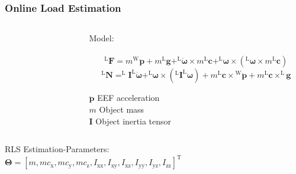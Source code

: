 \documentclass[student,noshadow]{ITRslides}
\renewcommand{\vec}[1]{\boldsymbol{#1}}
\renewcommand{\vec}[1]{\boldsymbol{#1}}
\newcommand{\scr}[1]{\mathrm{#1}}
\begin{document}
\begin{frame}
	\frametitle{Online Load Estimation}
	
	\begin{columns}
		\centering
		\begin{column}{0.25\textwidth}
			\begin{figure}
				\centering
				
			\end{figure}
		\end{column}
				 		
		\begin{column}{0.75\textwidth}
			Model:\\ \cite{literaturstelle2}\\
			\[^\scr{L}\vec{F} = m {^\scr{W}}\vec{\ddot{p}} + m ^\scr{L}\vec{g} + ^\scr{L}\vec{\dot{\omega}} \times m ^\scr{L}\vec{c} + ^\scr{L}\vec{\omega} \times (^\scr{L}\vec{\omega} \times m ^\scr{L}\vec{c})\]
			\[^\scr{L}\vec{N} = ^\scr{L}\vec{I} ^\scr{L}\vec{\dot{\omega}} + ^\scr{L}\vec{\omega} \times (^\scr{L}\vec{I} ^\scr{L}\vec{\omega}) + m ^\scr{L}\vec{c} \times {^\scr{W}}\vec{\ddot{p}} + m ^\scr{L}\vec{c} \times ^\scr{L}\vec{g}\]
						
			\vspace{0.1cm}
			$\vec{\ddot{p}}$ EEF acceleration\\
			$m$ Object mass\\
			$\vec{I}$  Object inertia tensor
		\end{column}
	\end{columns}
	\vspace{0.2cm}
	RLS Estimation-Parameters: \\
	$\vec{\Theta} = [m, m c_\scr{x}, m c_\scr{y}, m c_\scr{z}, I_\scr{xx}, I_\scr{xy}, I_\scr{xz}, I_\scr{yy},I_\scr{yz}, I_\scr{zz}]^\scr{T}$ \\
\end{frame}
\end{document}
